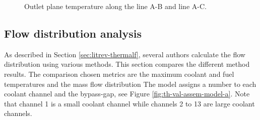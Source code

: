 \begin{figure}[htbp!]
  \centering
  \hfill
  \caption{Outlet plane temperature along the line A-B and line A-C.}
  \label{fig:th-val-assem-temps}
\end{figure}


\subsection{Flow distribution analysis}
\label{sec:flowdistrib}

As described in Section \ref{sec:litrev-thermalf}, several authors calculate the flow distribution using various methods.
This section compares the different method results.
The comparison chosen metrics are the maximum coolant and fuel temperatures and the mass flow distribution
The model assigns a number to each coolant channel and the bypass-gap, see Figure \ref{fig:th-val-assem-model-a}.
Note that channel 1 is a small coolant channel while channels 2 to 13 are large coolant channels.

